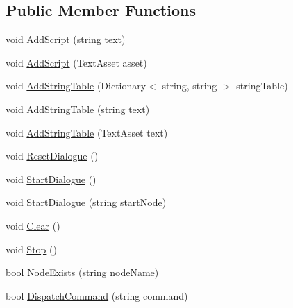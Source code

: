 \subsection*{Public Member Functions}
\begin{DoxyCompactItemize}
\item 
void \hyperlink{a00071_a88d161b1be7c99b1e202e6ae9e0d1e73}{Add\-Script} (string text)
\item 
void \hyperlink{a00071_a2fd7f165afff0b8bc2004f10ce4537dd}{Add\-Script} (Text\-Asset asset)
\item 
void \hyperlink{a00071_a2e9d9472b4dba699ef72ab558c89e009}{Add\-String\-Table} (Dictionary$<$ string, string $>$ string\-Table)
\item 
void \hyperlink{a00071_a08d4eb5038b23aad6d59d74ac89806a9}{Add\-String\-Table} (string text)
\item 
void \hyperlink{a00071_abc595a490988ca712d37af540c2e0df9}{Add\-String\-Table} (Text\-Asset text)
\item 
void \hyperlink{a00071_ac08900ac15b3ca90446b9454c7fd117e}{Reset\-Dialogue} ()
\item 
void \hyperlink{a00071_ab083d0ac60b41958b591c632e3c3a53e}{Start\-Dialogue} ()
\item 
void \hyperlink{a00071_abda765c6804853e264282a0f45920cd3}{Start\-Dialogue} (string \hyperlink{a00071_a61c92b8d2228d01d8ac123b73bbb41a0}{start\-Node})
\item 
void \hyperlink{a00071_a09f5769c0c0921a21e659fed0af09c01}{Clear} ()
\item 
void \hyperlink{a00071_af94e66876098f8b187181014973645e6}{Stop} ()
\item 
bool \hyperlink{a00071_aadf7711b9ba101d6ce8ba491d9c5a4c3}{Node\-Exists} (string node\-Name)
\item 
bool \hyperlink{a00071_a7b200f8ddcf77f50906a6341aadeb671}{Dispatch\-Command} (string command)
\end{DoxyCompactItemize}
